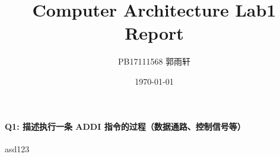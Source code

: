 \documentclass{article}
\title{Computer Architecture Lab1 Report}
\author{PB17111568 郭雨轩}
\date{\today}
\begin{document}
    \maketitle
    \paragraph{Q1: 描述执行一条 ADDI 指令的过程（数据通路、控制信号等）}
    
    asd123
\end{document}
